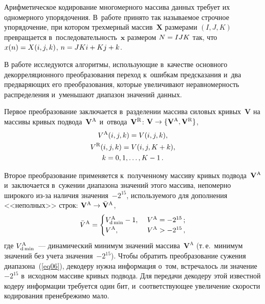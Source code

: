 \begin{multicols}{2}
Арифметическое кодирование многомерного массива данных требует их одномерного 
упорядочения. В~работе принято так называемое \mbox{строчное} упорядочение, при котором 
трехмерный массив~$\mathbf{X}$ размерами $(I,J,K)$ превращается в~последовательность~$\mathbf{x}$   
размером $N\hm= I J K$ так, что $x(n)\hm=X(i,j,k)$, $n\hm=J K i \hm+ K j +k$.

В работе исследуются алгоритмы, ис\-поль\-зу\-ющие в~качестве основного декорреляционного 
преобразования переход к~ошибкам предсказания и~два предваряющих его преобразования, 
которые увеличивают неравномерность распределения и~уменьшают диапазон значений данных.

Первое преобразование заключается в~разделении массива силовых кривых~$\mathbf{V}$ 
на массивы кривых подвода~$\mathbf{V}^{\text A}$ и~отвода~$\mathbf{V}^{\text R}$:  
$\mathbf{V}\hm\to\{\mathbf{V}^{\text A},\mathbf{V}^{\text R}\}$,
\begin{multline}
V^{\text A}(i,j,k) = V(i,j,k), \\
V^{\text R}(i,j,k) = V(i,j,K+k), \\
k = 0,1,\ldots,K-1\,.
\label{eq05}
\end{multline}

Второе преобразование применяется к~полученному массиву кривых 
подвода~$\mathbf{V}^{\text A}$ и~заключается в~сужении диапазона
 значений этого массива, непомерно широкого из-за наличия значения~$-2^{15}$, 
 используемого для дополнения <<неполных>> строк:  $\mathbf{V}^{\text A}\hm\to  \bar{\mathbf{V}}^{\text A}$,
\begin{equation}
\label{eq06}
\bar{V}^{\text A} = \begin{cases}
 V^{\text A}_{\text d\min} - 1, &\ V^{\text A}=-2^{15}\,;\\
 V^{\text A}, &\ V^{\text A}>-2^{15}\,,
\end{cases}
\end{equation}
где $V^{\text A}_{\text d\min}$~--- динамический минимум значений массива~$\mathbf{V}^\text{A}$ 
(т.\,е.\ минимум значений без учета значения~$-2^{15}$). Чтобы обратить преобразование 
сужения диапазона~(\ref{eq06}), декодеру нужна информация о~том, встречалось 
ли значение~$-2^{15}$ в~исходном массиве кривых подвода. Для передачи декодеру этой известной 
кодеру информации требуется один бит, и~соответствующее увеличение скорости
 кодирования пренебрежимо мало.


\end{multicols}
